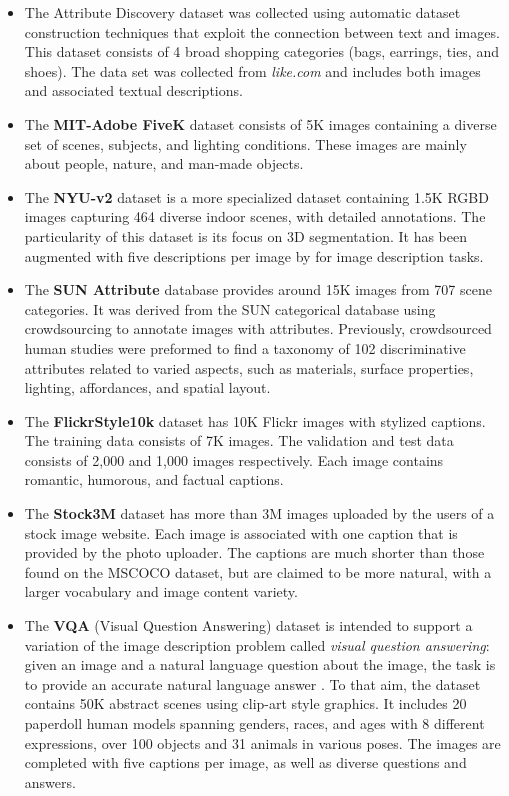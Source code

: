 \begin{itemize}
\item The Attribute Discovery dataset \citep{Berg2010} was collected using automatic dataset construction techniques that exploit the connection between text and images. This dataset consists of 4 broad shopping categories (bags, earrings, ties, and shoes). The data set was collected from \textit{like.com} and includes both images and associated textual descriptions.
\item The \textbf{MIT-Adobe FiveK} \citep{Bychkovsky2011} dataset consists of 5K images containing a diverse set of scenes, subjects, and lighting conditions. These images are mainly about people, nature, and man-made objects.
\item The \textbf{NYU-v2} dataset \citep{Silberman2012} is a more specialized dataset containing 1.5K RGBD images capturing 464 diverse indoor scenes, with detailed annotations. The particularity of this dataset is its focus on 3D segmentation. It has been augmented with five descriptions per image by \citet{Lin2015} for image description tasks.
\item The \textbf{SUN Attribute} database \citep{Patterson2014} provides around 15K  images from 707 scene categories. It was derived from the SUN categorical database using crowdsourcing to annotate images with attributes. Previously, crowdsourced human studies were preformed to find a taxonomy of 102 discriminative attributes related to varied aspects, such as materials, surface properties, lighting, affordances, and spatial layout.
\item The \textbf{FlickrStyle10k} dataset has 10K Flickr images with stylized captions. The training data consists of 7K images. The validation and test data consists of 2,000 and 1,000 images respectively. Each image contains romantic, humorous, and factual captions.
\item  The \textbf{Stock3M} dataset \citep{Wang2017} has more than 3M images uploaded by the users of a stock image website. Each image is associated with one caption that is provided by the photo uploader. The captions are much shorter than those found on the MSCOCO dataset, but are claimed to be more natural, with a larger vocabulary and image content variety.
\item The \textbf{VQA} (Visual Question Answering) dataset is intended to support a variation of the image description problem called \textit{visual question answering}: given an image and a natural language question about the image, the task is to provide an accurate natural language answer \citep{Antol2015}. To that aim, the dataset contains 50K abstract scenes using clip-art style graphics. It includes 20 paperdoll human models spanning genders, races, and ages with 8 different expressions, over 100 objects and 31 animals in various poses. The images are completed with five captions per image, as well as diverse questions and answers.
\end{itemize}

